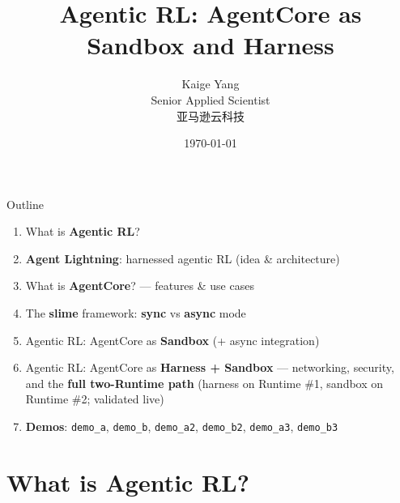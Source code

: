 \documentclass[aspectratio=169]{beamer}
\title[Agentic RL]{Agentic RL: AgentCore as Sandbox and Harness}
\author[Kaige Yang]{Kaige Yang \\ Senior Applied Scientist \\ 亚马逊云科技}
\date{\today}
\begin{document}
\begin{frame}
  \titlepage
\end{frame}

\begin{frame}{Outline}
  \small
  \begin{enumerate}\setlength\itemsep{0.35em}
    \item What is \textbf{Agentic RL}?
    \item \textbf{Agent Lightning}: harnessed agentic RL (idea \& architecture)
    \item What is \textbf{AgentCore}? --- features \& use cases
    \item The \textbf{slime} framework: \textbf{sync} vs \textbf{async} mode
    \item Agentic RL: AgentCore as \textbf{Sandbox} (+ async integration)
    \item Agentic RL: AgentCore as \textbf{Harness + Sandbox} --- networking, security, and the
      \textbf{full two-Runtime path} (harness on Runtime \#1, sandbox on Runtime \#2; validated live)
    \item \textbf{Demos}: \texttt{demo\_a}, \texttt{demo\_b}, \texttt{demo\_a2},
      \texttt{demo\_b2}, \texttt{demo\_a3}, \texttt{demo\_b3}
  \end{enumerate}
\end{frame}

\section{What is Agentic RL?}
\end{document}

